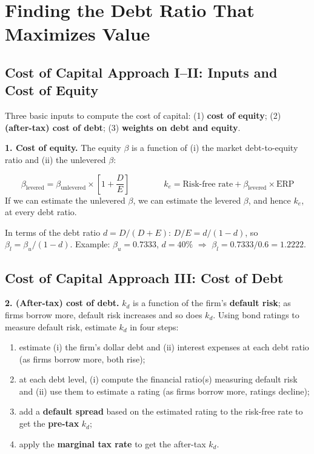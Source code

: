 \section{Finding the Debt Ratio That Maximizes Value}

\subsection[Cost of Capital Approach I--II: Inputs and Cost of Equity]{Cost of Capital Approach I--II: Inputs and Cost of Equity }

Three basic inputs to compute the cost of capital: (1) \textbf{cost of equity}; (2) \textbf{(after-tax) cost of debt}; (3) \textbf{weights on debt and equity}.

\textbf{1. Cost of equity.} The equity $\beta$ is a function of (i) the market debt-to-equity ratio and (ii) the unlevered $\beta$:
\begin{keybox}
\[
\beta_{\text{levered}}=\beta_{\text{unlevered}}\times\left[1+\frac{D}{E}\right]\qquad\qquad k_e=\text{Risk-free rate}+\beta_{\text{levered}}\times\text{ERP}
\]
If we can estimate the unlevered $\beta$, we can estimate the levered $\beta$, and hence $k_e$, at every debt ratio.
\end{keybox}
\begin{addbox}
In terms of the debt ratio $d=D/(D+E)$: $D/E=d/(1-d)$, so $\beta_l=\beta_u/(1-d)$. Example: $\beta_u=0.7333$, $d=40\%$ $\Rightarrow$ $\beta_l=0.7333/0.6=1.2222$.
\end{addbox}

\subsection[Cost of Capital Approach III: Cost of Debt]{Cost of Capital Approach III: Cost of Debt }

\textbf{2. (After-tax) cost of debt.} $k_d$ is a function of the firm's \textbf{default risk}; as firms borrow more, default risk increases and so does $k_d$. Using bond ratings to measure default risk, estimate $k_d$ in four steps:
\begin{enumerate}[label=\alph*)]
  \item estimate (i) the firm's dollar debt and (ii) interest expenses at each debt ratio (as firms borrow more, both rise);
  \item at each debt level, (i) compute the financial ratio(s) measuring default risk and (ii) use them to estimate a rating (as firms borrow more, ratings decline);
  \item add a \textbf{default spread} based on the estimated rating to the risk-free rate to get the \textbf{pre-tax} $k_d$;
  \item apply the \textbf{marginal tax rate} to get the after-tax $k_d$.
\end{enumerate}

